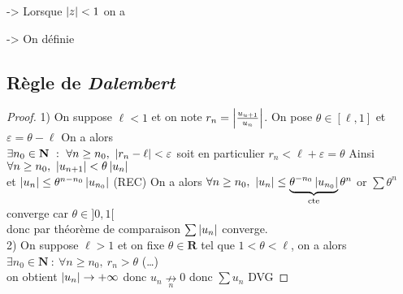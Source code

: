 
		\hspace*{2.5cm} -> Lorsque $\left\vert z \right\vert < 1$ on a 
		
		\hspace*{2.5cm} -> On définie  \medskip

	\subsection{Règle de \emph{Dalembert}}
	
		\medskip

		\begin{proof}
			{\small 1)} On suppose $\ell<1$ et on note $r_n = \left\vert \frac{u_{u+1}}{u_n} \right\vert$. On pose $\theta \in [\ell,1] $ et $\varepsilon = \theta -\ell$
			On a alors \\ $\exists n_0 \in \mathbf{N} ~:~ \forall n\geq n_0 ,~\left\vert r_n -\ell \right\vert <\varepsilon$  soit en particulier $r_n < \ell+\varepsilon 
			=\theta$ Ainsi $\forall n\geq n_0 ,~\left\vert u_{n+1} \right\vert < \theta\left\vert u_n \right\vert$ \\ et $ \left\vert u_n \right\vert \leq \theta^{n-n_0} \left\vert u_{n_0} \right\vert$ {\small (REC) }
			On a alors $\forall n\geq n_0 ,~\left\vert u_n \right\vert \leq \underbrace{\theta^{-n_0} \left\vert u_{n_0} \right\vert}_{\mathrm{cte}} \theta^n$ 
			or $\sum\theta^n$ converge car $\theta \in ]0,1[$ \\donc par théorème de comparaison $\sum \left\vert u_n \right\vert $ converge.
			\vspace*{0.2cm}\\ {\small 2)} On suppose $\ell>1$ et on fixe $\theta \in \mathbf{R}$ tel que $ 1<\theta <\ell$, 
			on a alors $\exists n_0 \in \mathbf{N} ~:~\forall n\geq n_0 ,~r_n > \theta$ (\dots)\\
			on obtient $\left\vert u_n \right\vert \to +\infty$ donc $u_n \underset{n}{\nrightarrow} 0$ donc $\sum u_n$ DVG
		\end{proof} \medskip 
		

